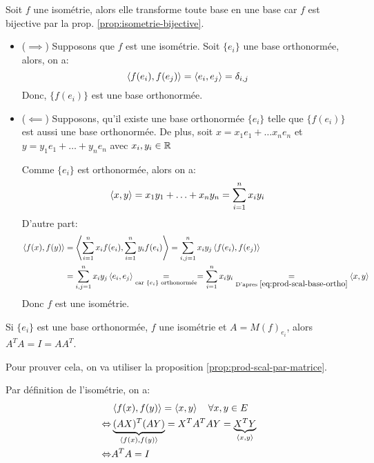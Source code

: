 \begin{preuve}
    Soit $f$ une isométrie, alors elle transforme toute base en une base car  $f$ est bijective par la prop. \ref{prop:isometrie-bijective}. 
    \begin{itemize}
        \item ($\implies$) Supposons que $f$ est une isométrie. Soit $\{e_i\}$ une base orthonormée, alors, on a:
             \[
                 \left\langle f(e_i), f(e_j) \right\rangle = \left\langle e_i, e_j \right\rangle = \delta_{i,j}
            \] 
            Donc, $\{f(e_i)\}$ est une base orthonormée.
        \item ($\impliedby$) Supposons, qu'il existe une base orthonormée $\{e_i\}$ telle que  $\{f(e_i)\}$ est aussi une base orthonormée. De plus, soit  $x = x_1e_1 + \ldots x_ne_n$ et $y = y_1e_1 + \ldots + y_ne_n$ avec $x_i, y_i \in \mathbb{R}$
            \par
            Comme $\{e_i\}$ est orthonormée, alors on a:
            \begin{equation}\label{eq:prod-scal-base-ortho}
                \left\langle x, y \right\rangle = x_1y_1 + \ldots + x_ny_n = \sum_{i=1}^{n} x_iy_i
            \end{equation}
            D'autre part:
            \begin{align*}
                \left\langle f(x), f(y) \right\rangle &= \left\langle \sum_{i=1}^{n} x_if(e_i), \sum_{i=1}^{n} y_if(e_i) \right\rangle = \sum_{i,j = 1}^{n} x_iy_j\left\langle f(e_i), f(e_j) \right\rangle\\
                                     &= \sum_{i,j=1}^{n} x_iy_j\left\langle e_i, e_j \right\rangle \underset{\text{car } \{e_i\} \text{ orthonormée}}{=} = \sum_{i=1}^{n} x_iy_i \underset{\text{D'apres } \ref{eq:prod-scal-base-ortho}}{=} \left\langle x, y \right\rangle
            \end{align*}
            Donc $f$ est une isométrie.
    \end{itemize}
\end{preuve}
\begin{prop}\label{prop:isometrie-ata-eg-i}
    Si $\{e_i\}$ est une base orthonormée, $f$ une isométrie et  $A = M(f)_{e_i}$, alors  $A^{T}A = I = AA^{T}$.
\end{prop}
\begin{preuve}
    Pour prouver cela, on va utiliser la proposition \ref{prop:prod-scal-par-matrice}. 
    \par
    Par définition de l'isométrie, on a:
    \begin{align*}
        &\left\langle f(x), f(y) \right\rangle = \left\langle x, y \right\rangle \quad \forall x, y \in E\\
        \Leftrightarrow &\underbrace{ (AX)^{T}(AY) }_{\left\langle f(x), f(y) \right\rangle} = X^TA^TAY = \underbrace{X^TY}_{\left\langle x, y \right\rangle}\\
        \Leftrightarrow &A^TA = I
    \end{align*}
\end{preuve}
